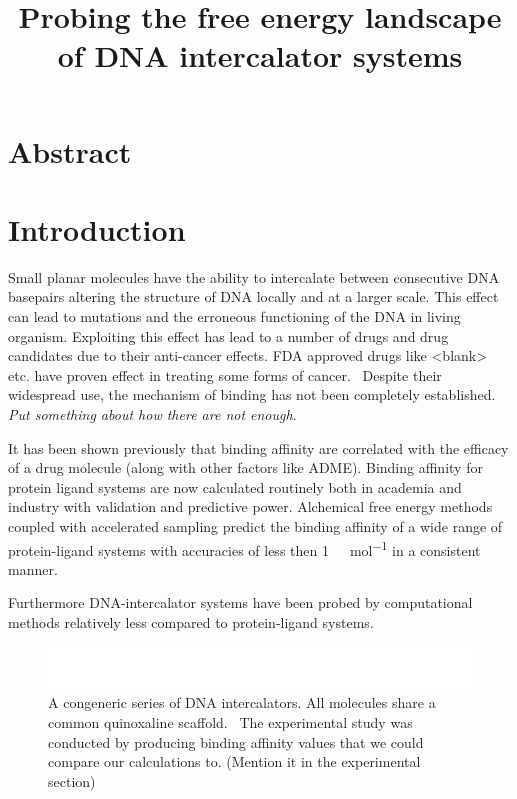 \documentclass{article}
\title{Probing the free energy landscape of DNA intercalator systems}
\begin{document}
  
\maketitle

\section*{Abstract}

\section{Introduction}


Small planar molecules have the ability to intercalate between consecutive DNA basepairs altering the structure of DNA locally and at a larger scale. This effect can lead to mutations and the erroneous functioning of the DNA in living organism. Exploiting this effect has lead to a number of drugs and drug candidates due to their anti-cancer effects. FDA approved drugs like <blank> etc. have proven effect in treating some forms of cancer. ~Despite their widespread use, the mechanism of binding has not been completely established.~ \emph{Put something about how there are not enough}. 

It has been shown previously that binding affinity are correlated with the efficacy of a drug molecule (along with other factors like ADME). Binding affinity for protein ligand systems are now calculated routinely both in academia and industry with validation and predictive power. Alchemical free energy methods coupled with accelerated sampling predict the binding affinity of a wide range of protein-ligand systems with accuracies of less then \SI{1}{\kilo\calorie\per\mol} in a consistent manner.




Furthermore DNA-intercalator systems have been probed by computational methods relatively less compared to protein-ligand systems.



\begin{figure}[h]
	\includegraphics[width=\textwidth]{intercalators.pdf}
	\caption{A congeneric series of DNA intercalators. All molecules share a common quinoxaline scaffold. ~The experimental study was conducted by \cite{} producing binding affinity values that we could compare our calculations to. (Mention it in the experimental section)~ }
	\label{fig:intercalators}
\end{figure}
\end{document}
